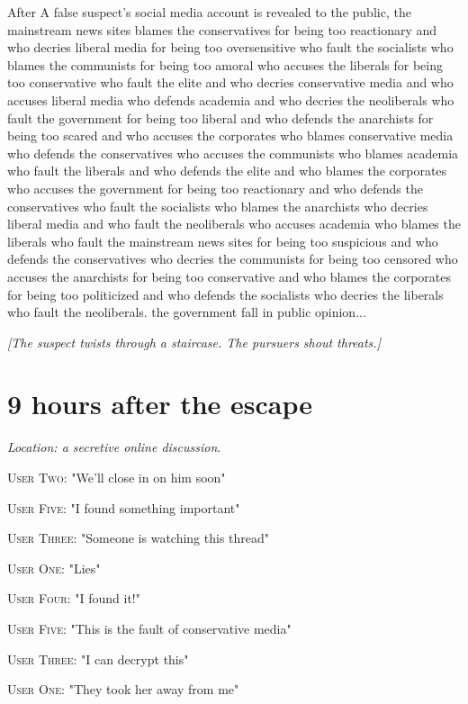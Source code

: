 \documentclass{report}
\begin{document}
After A false suspect's social media account is revealed to the public, the mainstream news sites blames the conservatives for being too reactionary and who decries liberal media for being too oversensitive who fault the socialists who blames the communists for being too amoral who accuses the liberals for being too conservative who fault the elite and who decries conservative media and who accuses liberal media who defends academia and who decries the neoliberals who fault the government for being too liberal and who defends the anarchists for being too scared and who accuses the corporates who blames conservative media who defends the conservatives who accuses the communists who blames academia who fault the liberals and who defends the elite and who blames the corporates who accuses the government for being too reactionary and who defends the conservatives who fault the socialists who blames the anarchists who decries liberal media and who fault the neoliberals who accuses academia who blames the liberals who fault the mainstream news sites for being too suspicious and who defends the conservatives who decries the communists for being too censored who accuses the anarchists for being too conservative and who blames the corporates for being too politicized and who defends the socialists who decries the liberals who fault the neoliberals. the government fall in public opinion...

\textit{[The suspect twists through a staircase. The pursuers shout threats.]}


\section*{9 \small{hours after the escape}}

\textit{Location: a secretive online discussion}. 

\textsc{User Two}: "We'll close in on him soon" 

\textsc{User Five}: "I found something important" 

\textsc{User Three}: "Someone is watching this thread" 

\textsc{User One}: "Lies" 

\textsc{User Four}: "I found it!" 

\textsc{User Five}: "This is the fault of conservative media" 

\textsc{User Three}: "I can decrypt this" 

\textsc{User One}: "They took her away from me" 
\end{document}
